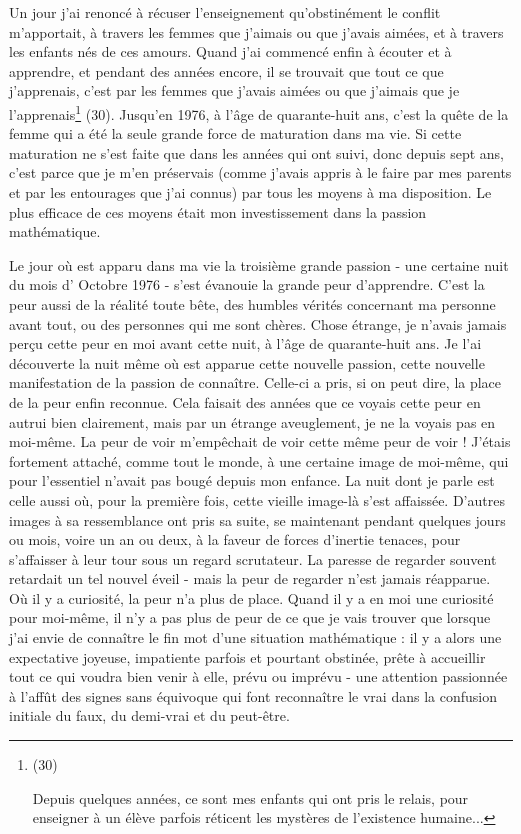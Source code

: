 Un jour j'ai renoncé à récuser l'enseignement qu'obstinément le conflit m'apportait, à travers les femmes que j'aimais ou que j'avais aimées, et à travers les enfants nés de ces amours. Quand j'ai commencé enfin à écouter et à apprendre, et pendant des années encore, il se trouvait que tout ce que j'apprenais, c'est par les femmes que j'avais aimées ou que j'aimais que je l'apprenais\footnote{(30)\par Depuis quelques années, ce sont mes enfants qui ont pris le relais, pour enseigner à un élève parfois réticent les mystères de l'existence humaine...} (30). Jusqu'en 1976, à l'âge de quarante-huit ans, c'est la quête de la femme qui a été la seule grande force de maturation dans ma vie. Si cette maturation ne s'est faite que dans les années qui ont suivi, donc depuis sept ans, c'est parce que je m'en préservais (comme j'avais appris à le faire par mes parents et par les entourages que j'ai connus) par tous les moyens à ma disposition. Le plus efficace de ces moyens était mon investissement dans la passion mathématique.

Le jour où est apparu dans ma vie la troisième grande passion - une certaine nuit du mois d' Octobre 1976 - s'est évanouie la grande peur d'apprendre. C'est la peur aussi de la réalité toute bête, des humbles vérités concernant ma personne avant tout, ou des personnes qui me sont chères. Chose étrange, je n'avais jamais perçu cette peur en moi avant cette nuit, à l'âge de quarante-huit ans. Je l'ai découverte la nuit même où est apparue cette nouvelle passion, cette nouvelle manifestation de la passion de connaître. Celle-ci a pris, si on peut dire, la place de la peur enfin reconnue. Cela faisait des années que ce voyais cette peur en autrui bien clairement, mais par un étrange aveuglement, je ne la voyais pas en moi-même. La peur de voir m'empêchait de voir cette même peur de voir ! J'étais fortement attaché, comme tout le monde, à une certaine image de moi-même, qui pour l'essentiel n'avait pas bougé depuis mon enfance. La nuit dont je parle est celle aussi où, pour la première fois, cette vieille image-là s'est affaissée. D'autres images à sa ressemblance ont pris sa suite, se maintenant pendant quelques jours ou mois, voire un an ou deux, à la faveur de forces d'inertie tenaces, pour s'affaisser à leur tour sous un regard scrutateur. La paresse de regarder souvent retardait un tel nouvel éveil - mais la peur de regarder n'est jamais réapparue. Où il y a curiosité, la peur n'a plus de place. Quand il y a en moi une curiosité pour moi-même, il n'y a pas plus de peur de ce que je vais trouver que lorsque j'ai envie de connaître le fin mot d'une situation mathématique : il y a alors une expectative joyeuse, impatiente parfois et pourtant obstinée, prête à accueillir tout ce qui voudra bien venir à elle, prévu ou imprévu - une attention passionnée à l'affût des signes sans équivoque qui font reconnaître le vrai dans la confusion initiale du faux, du demi-vrai et du peut-être.

